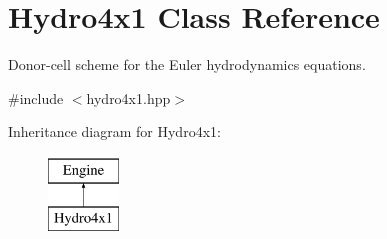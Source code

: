 \hypertarget{classHydro4x1}{}\section{Hydro4x1 Class Reference}
\label{classHydro4x1}


Donor-\/cell scheme for the Euler hydrodynamics equations.  




{\ttfamily \#include $<$hydro4x1.\+hpp$>$}

Inheritance diagram for Hydro4x1\+:\begin{figure}[H]
\begin{center}
\leavevmode
\includegraphics[height=2.000000cm]{classHydro4x1}
\end{center}
\end{figure}
